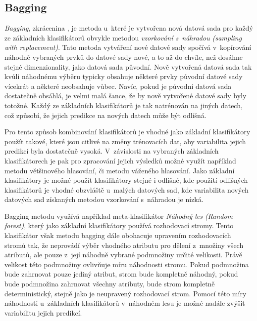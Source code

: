 \subsection*{Bagging}
\label{bagging}
\textit{Bagging}, zkrácenina , je metoda u~které je vytvořena nová datová sada pro každý ze základních klasifikátorů obvykle metodou \textit{vzorkování s~náhradou (sampling with replacement)}. Tato metoda vytváření nové datové sady spočívá v~kopírování náhodně vybraných prvků do datové sady nové, a to až do chvíle, než dosáhne stejné dimenzionality, jako datová sada původní. Nově vytvořená datová sada tak kvůli náhodnému výběru typicky obsahuje některé prvky původní datové sady vícekrát a některé neobsahuje vůbec. Navíc, pokud je původní datová sada dostatečně obsáhlá, je velmi malá šance, že by nově vytvořené datové sady byly totožné. Každý ze základních klasifikátorů je tak natrénován na jiných datech, což způsobí, že jejich predikce na nových datech může být odlišná.

Pro tento způsob kombinování klasifikátorů je vhodné jako základní klasifikátory použít takové, které jsou citlivé na změny trénovacích dat, aby variabilita jejich predikcí byla dostatečně vysoká. V~závislosti na vybraných základních klasifikátorech je pak pro zpracování jejich výsledků možné využít například metodu většinového hlasování, či metodu váženého hlasování. Jako základní klasifikátory je možné použít klasifikátory stejné i odlišné, kde použití odlišných klasifikátorů je vhodné obzvláště u~malých datových sad, kde variabilita nových datových sad získaných metodou vzorkování s~náhradou je nízká.\cite{data_classification}

Bagging metodu využívá například meta-klasifikátor \textit{Náhodný les (Random forest)}, který jako základní klasifikátory používá rozhodovací stromy. Tento klasifikátor však metodu bagging dále obohacuje upravením rozhodovacích stromů tak, že neprovádí výběr vhodného atributu pro dělení z~množiny všech atributů, ale pouze z~její náhodně vybrané podmnožiny určité velikosti. Právě velikost této podmnožiny ovlivňuje míru náhodnosti stromu. Pokud podmnožina bude zahrnovat pouze jediný atribut, strom bude kompletně náhodný, pokud bude podmnožina zahrnovat všechny atributy, bude strom kompletně deterministický, stejně jako je neupravený rozhodovací strom. Pomocí této míry náhodnosti u~základních klasifikátorů v~náhodném lesu je možné nadále zvýšit variabilitu jejich predikcí.\cite{data_classification} 


